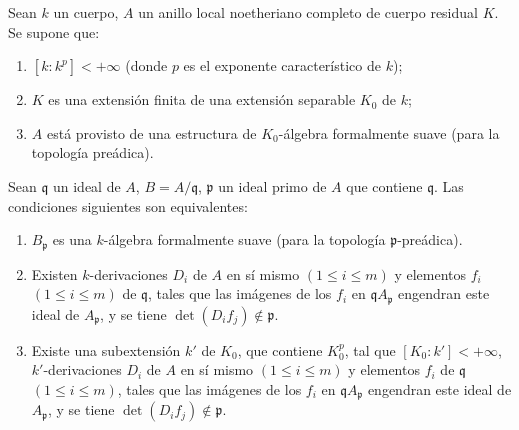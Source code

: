 \begin{theorem}[22.7.3]
\label{0.22.7.3-fr}
Sean $k$ un cuerpo, $A$ un anillo local noetheriano completo de cuerpo residual
$K$. Se supone que:
\begin{enumerate}
  \item[$1^\circ$] $[k:k^p]<+\infty$ (donde $p$ es el exponente característico
  de $k$);
  \item[$2^\circ$] $K$ es una extensión finita de una extensión separable
  $K_0$ de $k$;
  \item[$3^\circ$] $A$ está provisto de una estructura de $K_0$-álgebra formalmente
  suave (para la topología preádica).
\end{enumerate}
Sean $\mathfrak q$ un ideal de $A$, $B=A/\mathfrak q$, $\mathfrak p$ un
ideal primo de $A$ que contiene $\mathfrak q$. Las condiciones siguientes son
equivalentes:
\begin{enumerate}
  \item[\textup{a)}] $B_{\mathfrak p}$ es una $k$-álgebra formalmente suave (para la
  topología $\mathfrak p$-preádica).
  \item[\textup{b)}] Existen $k$-derivaciones $D_i$ de $A$ en sí mismo
  $(1\leq i\leq m)$ y elementos $f_i$ $(1\leq i\leq m)$ de
  $\mathfrak q$, tales que las imágenes de los $f_i$ en
  $\mathfrak qA_{\mathfrak p}$ engendran este ideal de $A_{\mathfrak p}$, y
  se tiene $\det(D_if_j)\notin\mathfrak p$.
  \item[\textup{b')}] Existe una subextensión $k'$ de $K_0$, que contiene $K_0^p$,
  tal que $[K_0:k']<+\infty$, $k'$-derivaciones $D_i$ de $A$ en
  sí mismo $(1\leq i\leq m)$ y elementos $f_i$ de $\mathfrak q$
  $(1\leq i\leq m)$, tales que las imágenes de los $f_i$ en
  $\mathfrak qA_{\mathfrak p}$ engendran este ideal de $A_{\mathfrak p}$, y
  se tiene $\det(D_if_j)\notin\mathfrak p$.
\end{enumerate}
\end{theorem}

